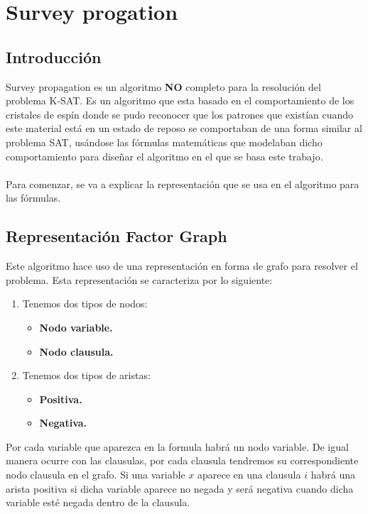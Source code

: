 \section{Survey progation}
\subsection{Introducción}
Survey propagation es un algoritmo \textbf{NO} completo para la resolución del problema K-SAT.
Es un algoritmo que esta basado en el comportamiento de los cristales de espín donde se pudo reconocer que los patrones que existían cuando este material está en un estado de reposo se comportaban de una forma similar al problema SAT, usándose las fórmulas matemáticas que modelaban dicho comportamiento para diseñar el algoritmo en el que se basa este trabajo.\\\\
Para comenzar, se va a explicar la representación que se usa en el algoritmo para las fórmulas. 
\subsection{Representación Factor Graph}
Este algoritmo hace uso de una representación en forma de grafo para resolver el problema. Esta representación se caracteriza por lo siguiente:
\begin{enumerate}
	\item Tenemos dos tipos de nodos:
	\begin{itemize}
		\item \textbf{Nodo variable.}
		\item \textbf{Nodo clausula.}
	\end{itemize}
	\item Tenemos dos tipos de aristas:
	\begin{itemize}
		\item \textbf{Positiva.}
		\item \textbf{Negativa.}
	\end{itemize}
\end{enumerate}

Por cada variable que aparezca en la formula habrá un nodo variable. De igual manera ocurre con las clausulas, por cada clausula tendremos su correspondiente nodo clausula en el grafo. 
Si una variable $x$ aparece en una clausula $i$ habrá una arista positiva si dicha variable aparece no negada y será negativa cuando dicha variable esté negada dentro de la clausula.

